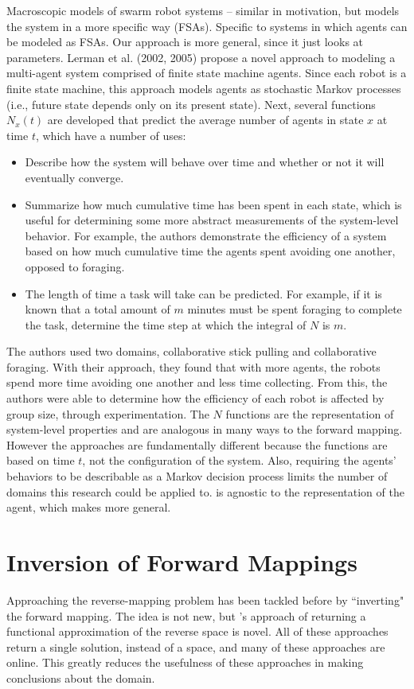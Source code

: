Macroscopic models of swarm robot systems \cite{lerman2002mmf}\cite{lerman2005rpm} -- similar in motivation, but models the system in a more specific way (FSAs). Specific to systems in which agents can be modeled as FSAs. Our approach is more general, since it just looks at parameters.
Lerman et al. (2002, 2005) propose a novel approach to modeling a multi-agent system comprised of finite state machine agents.
Since each robot is a finite state machine, this approach models agents as stochastic Markov processes (i.e., future state depends only on its present state).
Next, several functions $N_x(t)$ are developed that predict the average number of agents in state $x$ at time $t$, which have a number of uses:
\begin{itemize}
\item Describe how the system will behave over time and whether or not it will eventually converge.
\item Summarize how much cumulative time has been spent in each state, which is useful for determining some more abstract measurements of the system-level behavior. For example, the authors demonstrate the efficiency of a system based on how much cumulative time the agents spent avoiding one another, opposed to foraging.
\item The length of time a task will take can be predicted. For example, if it is known that a total amount of $m$ minutes must be spent foraging to complete the task, determine the time step at which the integral of $N$ is $m$.
\end{itemize}
The authors used two domains, collaborative stick pulling and collaborative foraging.
With their approach, they found that with more agents, the robots spend more time avoiding one another and less time collecting.
From this, the authors were able to determine how the efficiency of each robot is affected by group size, through experimentation.
The $N$ functions are the representation of system-level properties and are analogous in many ways to the \fw forward mapping.
However the approaches are fundamentally different because the functions are based on time $t$, not the configuration of the system.
Also, requiring the agents' behaviors to be describable as a Markov decision process limits the number of domains this research could be applied to.
\fw is agnostic to the representation of the agent, which makes \fw more general.


\section{Inversion of Forward Mappings}
\label{sec:invfm}
Approaching the reverse-mapping problem has been tackled before by ``inverting" the forward mapping.
The idea is not new, but  \fw's approach of returning a functional approximation of the reverse space is novel.
All of these approaches return a single solution, instead of a space, and many of these approaches are online.
This greatly reduces the usefulness of these approaches in making conclusions about the domain.

